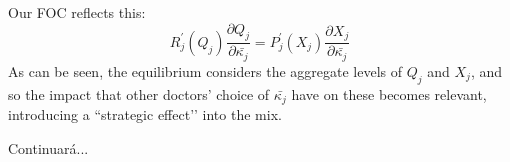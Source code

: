 \documentclass{article}
\begin{document}
Our FOC reflects this:
\begin{equation*}
 R_j^{\prime}(Q_j)\frac{\partial Q_j}{\partial\bar{\kappa_j}} = P_j^{\prime}(X_j)\frac{\partial X_j}{\partial \bar{\kappa_j}} 
\end{equation*}
As can be seen, the equilibrium considers the aggregate levels of $Q_j$ and $X_j$, and so the impact that other doctors’ choice of $\bar{\kappa_j}$ have on these becomes relevant, introducing a ``strategic effect’’ into the mix.

Continuará...
\end{document}

